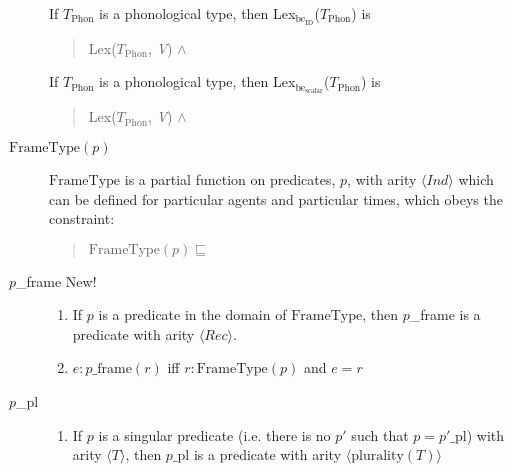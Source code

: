 \begin{description}
  If $T_{\mathrm{Phon}}$ is a phonological type, then
  Lex$_{\mathrm{be}_{\text{ID}}}$($T_{\mathrm{Phon}}$) is
\begin{quote}
  Lex($T_{\mathrm{Phon}}$,
\textit{V}) \d{$\wedge$}
\end{quote}

If $T_{\mathrm{Phon}}$ is a phonological type, then
  Lex$_{\mathrm{be}_{\text{scalar}}}$($T_{\mathrm{Phon}}$) is
\begin{quote}
  Lex($T_{\mathrm{Phon}}$,
\textit{V}) \d{$\wedge$}
\end{quote}

\item[\textnormal{$\mathrm{FrameType}(p)$}] \mbox{}

  $\mathrm{FrameType}$ is a partial function on predicates, $p$, with
  arity $\langle\textit{Ind}\rangle$ which can be defined for
  particular agents and particular times, which obeys the constraint:
  \begin{quote}
    $\mathrm{FrameType}(p)\sqsubseteq$ 
\end{quote}

\item[\textnormal{$p$\_frame} New!] \mbox{}

  \begin{enumerate} 
 
\item If $p$ is a predicate in the domain of $\mathrm{FrameType}$,
  then $p$\_frame is a predicate with arity $\langle\textit{Rec}\rangle$. 
 
\item $e:p\_\text{frame}(r)$ iff $r:\mathrm{FrameType}(p)$ and $e=r$ 
 
\end{enumerate}

\item[\textnormal{$p$\_pl}] \mbox{}

  \begin{enumerate} 
 
\item If $p$ is a singular predicate (i.e. there is no $p'$ such that
  $p=p'\_\text{pl}$) with arity $\langle T\rangle$, then
  $p\_\text{pl}$ is a predicate with arity $\langle\mathrm{plurality}(T)\rangle$ 
 

\end{enumerate}
\end{description}

